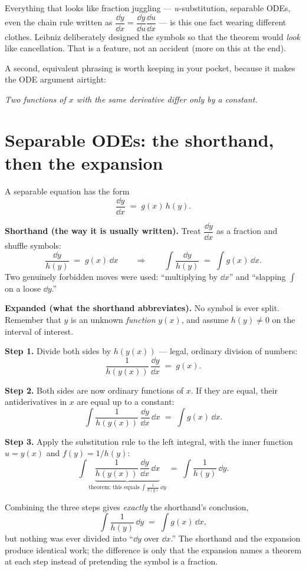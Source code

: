 \documentclass{essay}
\newcommand{\ddx}[1]{\frac{\dd #1}{\dd x}}
\begin{document}
Everything that looks like fraction juggling --- \(u\)-substitution,
separable ODEs, even the chain rule written as \(\dfrac{\dd y}{\dd
x}=\dfrac{\dd y}{\dd u}\dfrac{\dd u}{\dd x}\) --- is this one fact
wearing different clothes. Leibniz deliberately designed the symbols
so that the theorem would \emph{look} like cancellation. That is a
feature, not an accident (more on this at the end).

A second, equivalent phrasing is worth keeping in your pocket,
because it makes the ODE argument airtight:

\begin{center}
  \itshape
  Two functions of \(x\) with the same derivative differ only by a constant.
\end{center}

\section{Separable ODEs: the shorthand, then the expansion}

A separable equation has the form
\[ \ddx{y} \;=\; g(x)\,h(y). \]

\textbf{Shorthand (the way it is usually written).}
Treat \(\dfrac{\dd y}{\dd x}\) as a fraction and shuffle symbols:
\[ \frac{\dd y}{h(y)} \;=\; g(x)\,\dd x \qquad\Longrightarrow\qquad \int \frac{\dd y}{h(y)} \;=\; \int g(x)\,\dd x . \]
Two genuinely forbidden moves were used: ``multiplying by \(\dd x\)''
and ``slapping \(\int\) on a loose \(\dd y\).''

\textbf{Expanded (what the shorthand abbreviates).}
No symbol is ever split. Remember that \(y\) is an unknown
\emph{function} \(y(x)\), and assume \(h(y)\neq 0\) on the interval of interest.

\textbf{Step 1.} Divide both sides by \(h(y(x))\) --- legal, ordinary
division of numbers:
\[ \frac{1}{h(y(x))}\,\ddx{y} \;=\; g(x). \]

\textbf{Step 2.} Both sides are now ordinary functions of \(x\). If
they are equal, their antiderivatives in \(x\) are equal up to a constant:
\[ \int \frac{1}{h(y(x))}\,\ddx{y}\,\dd x \;=\; \int g(x)\,\dd x . \]

\textbf{Step 3.} Apply the substitution rule to the left integral,
with the inner function \(u=y(x)\) and \(f(y)=1/h(y)\):
\[ \int \underbrace{\frac{1}{h(y(x))}\,\ddx{y}\,\dd x}_{\text{theorem: this equals}\ \int \frac{1}{h(y)}\,\dd y} \;=\; \int \frac{1}{h(y)}\,\dd y . \]

Combining the three steps gives \emph{exactly} the shorthand's conclusion,
\[ \int \frac{1}{h(y)}\,\dd y \;=\; \int g(x)\,\dd x, \]
but nothing was ever divided into ``\(\dd y\) over \(\dd x\).'' The
shorthand and the expansion produce identical work; the difference is
only that the expansion names a theorem at each step instead of
pretending the symbol is a fraction.
\end{document}
